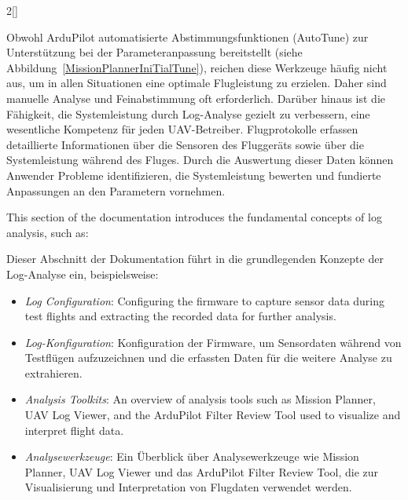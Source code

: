 \begin{paracol}{2}[]
\colger

Obwohl ArduPilot automatisierte Abstimmungsfunktionen (AutoTune) zur Unterstützung bei der Parameteranpassung bereitstellt (siehe Abbildung~\ref{MissionPlannerIniTialTune}), reichen diese Werkzeuge häufig nicht aus, um in allen Situationen eine optimale Flugleistung zu erzielen. Daher sind manuelle Analyse und Feinabstimmung oft erforderlich. Darüber hinaus ist die Fähigkeit, die Systemleistung durch Log-Analyse gezielt zu verbessern, eine wesentliche Kompetenz für jeden UAV-Betreiber. Flugprotokolle erfassen detaillierte Informationen über die Sensoren des Fluggeräts sowie über die Systemleistung während des Fluges. Durch die Auswertung dieser Daten können Anwender Probleme identifizieren, die Systemleistung bewerten und fundierte Anpassungen an den Parametern vornehmen.

\coleng

This section of the documentation introduces the fundamental concepts of log analysis, such as:

\colger

Dieser Abschnitt der Dokumentation führt in die grundlegenden Konzepte der Log-Analyse ein, beispielsweise:

\coleng

\begin{itemize}
\item \textsl{Log Configuration}: Configuring the firmware to capture sensor data during test flights and extracting the recorded data for further analysis.
\end{itemize}

\colger

\begin{itemize}
\item \textsl{Log-Konfiguration}: Konfiguration der Firmware, um Sensordaten während von Testflügen aufzuzeichnen und die erfassten Daten für die weitere Analyse zu extrahieren.
\end{itemize}

\coleng

\begin{itemize}
\item \textsl{Analysis Toolkits}: An overview of analysis tools such as Mission Planner, UAV Log Viewer, and the ArduPilot Filter Review Tool used to visualize and interpret flight data.
\end{itemize}

\colger

\begin{itemize}
\item \textsl{Analysewerkzeuge}: Ein Überblick über Analysewerkzeuge wie Mission Planner, UAV Log Viewer und das ArduPilot Filter Review Tool, die zur Visualisierung und Interpretation von Flugdaten verwendet werden.
\end{itemize}


\end{paracol}
